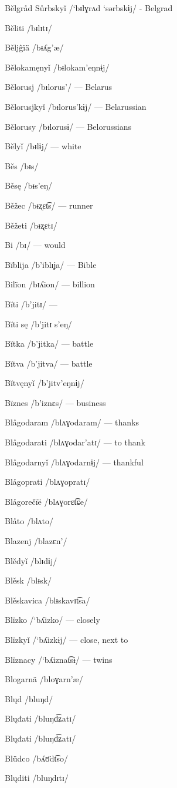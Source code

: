 Bělgråd Sůrbskyǐ /`bᵻlɣrʌd `sərbskɨj/ - Belgrad

Běliti /bᵻlɪtɪ/

Běljĝïä /bᵻʎg’æ/

Bělokamęnyǐ /bᵻlokam’eŋnɨj/

Bělorusj /bᵻlorus’/ — Belarus

Bělorusjkyǐ /bᵻlorus’kɨj/ — Belarussian

Bělorusy /bᵻlorusɨ/ — Belorussians

Bělyǐ /bᵻlɨj/ — white

Běs /bᵻs/

Běsę /bᵻs’eŋ/

Běžec /bᵻʐɛt͡s/ — runner

Běžeti /bᵻʐɛtɪ/

Bi /bɪ/ — would

Bïblija /b’iblɪʝa/ — Bible

Bilïon /bɪʎion/ — billion

Bĭti /b’jitɪ/ —

Bĭti sę /b’jitɪ s’eŋ/

Bĭtka /b’jitka/ — battle

Bĭtva /b’jitva/ — battle

Bĭtvęnyǐ /b’jitv’eŋnɨj/

Bïznes /b’iznɛs/ — business

Blågodaram /blʌɣodaram/ — thanks

Blågodarati /blʌɣodar’atɪ/ — to thank

Blågodarnyǐ /blʌɣodarnɨj/ — thankful

Blågoprati /blʌɣopratɪ/

Blågorečïë /blʌɣorɛt͡ɕe/

Blåto /blʌto/

Blazenj /blazɛn’/

Blědyǐ /blᵻdɨj/

Blěsk /blᵻsk/

Blěskavica /blᵻskavɪt͡sa/

Blïzko /`bʎizko/ — closely

Blïzkyǐ /`bʎizkɨj/ — close, next to

Blïznacy /`bʎiznat͡sɨ/ — twins

Blogarnä /bloɣarn’æ/

Blųd /bluŋd/

Blųđati /bluŋd͡ʑatɪ/

Blųđati /bluŋd͡ʑatɪ/

Blüdco /bʎʊ̈dt͡so/

Blųditi /bluŋdɪtɪ/

